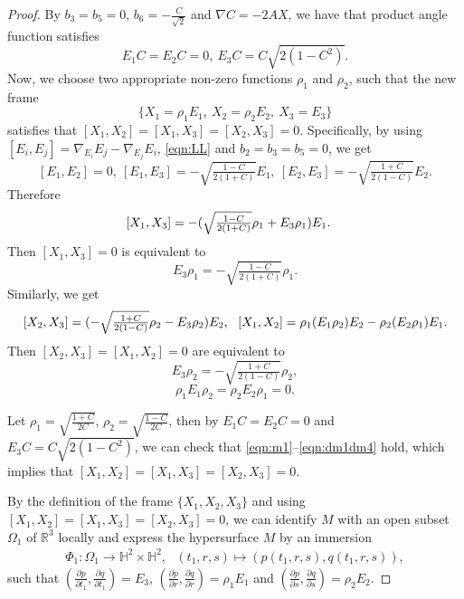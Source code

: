 \documentclass[reqno]{amsart}%
\theoremstyle{definition}
\numberwithin{equation}{section}
\begin{document}
\begin{proof}
By $b_3=b_5=0$, $b_6=-\frac{C}{\sqrt{2}}$ and $\nabla C=-2AX$, we have that product angle function satisfies
$$
E_1C=E_2C=0,\ E_3C=C\sqrt{2(1-C^2)}.
$$
Now, we choose two appropriate non-zero functions $\rho_1$ and $\rho_2$, such that
the new frame
$$
\{X_1=\rho_1E_1,\ X_2=\rho_2E_2,\ X_3=E_3\}
$$
satisfies that $[X_1,X_2]=[X_1,X_3]=[X_2,X_3]=0$. Specifically, by using
$[E_i,E_j]=\nabla_{E_i} {E_j}-\nabla_{E_j} {E_i}$, \eqref{eqn:LL} and $b_2=b_3=b_5=0$, we get
$$
[E_1,E_2]=0,\ [E_1,E_3]=-\sqrt{\tfrac{1-C}{2(1+C)}}E_1,\ [E_2,E_3]=-\sqrt{\tfrac{1+C}{2(1-C)}}E_2.
$$
Therefore
$$
\begin{aligned}
{\text [X_1,X_3]}&=-(\sqrt{\tfrac{1-C}{2(1+C)}}\rho_1+E_3\rho_1)E_1.
\end{aligned}
$$
Then $[X_1,X_3]=0$ is equivalent to
%
\begin{equation}\label{eqn:m1}
E_3\rho_1=-\sqrt{\tfrac{1-C}{2(1+C)}}\rho_1.
\end{equation}
Similarly, we get
$$
{\text [X_2,X_3]}=(-\sqrt{\tfrac{1+C}{2(1-C)}}\rho_2-E_3\rho_2)E_2,\ \
{\text [X_1,X_2]}=\rho_1(E_1\rho_2)E_2-\rho_2(E_2\rho_1)E_1.
$$
Then $[X_2,X_3]=[X_1,X_2]=0$ are equivalent to
%
\begin{equation}\label{eqn:m2}
E_3\rho_2=-\sqrt{\tfrac{1+C}{2(1-C)}}\rho_2,
\end{equation}
%
\begin{equation}\label{eqn:dm1dm4}
\rho_1 E_1\rho_2=\rho_2E_2\rho_1=0.
\end{equation}

Let $\rho_1=\sqrt{\frac{1+C}{2C}}$, $\rho_2=\sqrt{\frac{1-C}{2C}}$, then by $E_1C=E_2C=0$ and $E_3C=C\sqrt{2(1-C^2)}$,
we can check that \eqref{eqn:m1}--\eqref{eqn:dm1dm4} hold, which implies that $[X_1,X_2]=[X_1,X_3]=[X_2,X_3]=0$.

By the definition of the frame $\{X_1,X_2,X_3\}$ and using $[X_1,X_2]=[X_1,X_3]=[X_2,X_3]=0$,
we can identify $M$ with an open subset $\Omega_1$ of $\mathbb{R}^3$ locally and express the hypersurface $M$ by an immersion
$$
\begin{aligned}
\Phi_1:\Omega_1
\longrightarrow\mathbb{H}^2\times\mathbb{H}^2,\ \ \
(t_1,r,s)\mapsto (p(t_1,r,s),q(t_1,r,s)),
\end{aligned}
$$
such that $(\frac{\partial p}{\partial t_1},\frac{\partial q}{\partial t_1})=E_3$,
$(\frac{\partial p}{\partial r},\frac{\partial q}{\partial r})=\rho_1E_1$ and
$(\frac{\partial p}{\partial s},\frac{\partial q}{\partial s})=\rho_2E_2$.



\end{proof}
\end{document}
